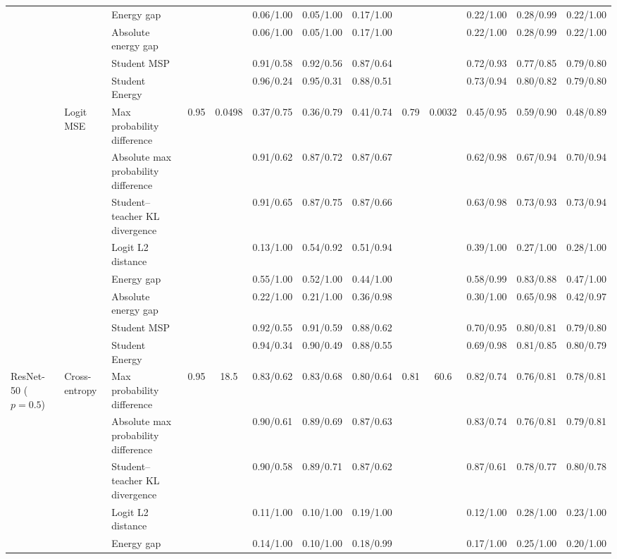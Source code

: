 \documentclass[border=2pt]{standalone}
\begin{document}
\begin{tabular}{lllcccccccccc}
 &  & Energy gap &  &  & 0.06/1.00 & 0.05/1.00 & 0.17/1.00 &  &  & 0.22/1.00 & 0.28/0.99 & 0.22/1.00 \\
 &  & Absolute energy gap &  &  & 0.06/1.00 & 0.05/1.00 & 0.17/1.00 &  &  & 0.22/1.00 & 0.28/0.99 & 0.22/1.00 \\
 &  & Student MSP &  &  & 0.91/0.58 & 0.92/0.56 & 0.87/0.64 &  &  & 0.72/0.93 & 0.77/0.85 & 0.79/0.80 \\
 &  & Student Energy &  &  & 0.96/0.24 & 0.95/0.31 & 0.88/0.51 &  &  & 0.73/0.94 & 0.80/0.82 & 0.79/0.80 \\
\addlinespace
 & Logit MSE & Max probability difference & 0.95 & 0.0498 & 0.37/0.75 & 0.36/0.79 & 0.41/0.74 & 0.79 & 0.0032 & 0.45/0.95 & 0.59/0.90 & 0.48/0.89 \\
 &  & Absolute max probability difference &  &  & 0.91/0.62 & 0.87/0.72 & 0.87/0.67 &  &  & 0.62/0.98 & 0.67/0.94 & 0.70/0.94 \\
 &  & Student--teacher KL divergence &  &  & 0.91/0.65 & 0.87/0.75 & 0.87/0.66 &  &  & 0.63/0.98 & 0.73/0.93 & 0.73/0.94 \\
 &  & Logit L2 distance &  &  & 0.13/1.00 & 0.54/0.92 & 0.51/0.94 &  &  & 0.39/1.00 & 0.27/1.00 & 0.28/1.00 \\
 &  & Energy gap &  &  & 0.55/1.00 & 0.52/1.00 & 0.44/1.00 &  &  & 0.58/0.99 & 0.83/0.88 & 0.47/1.00 \\
 &  & Absolute energy gap &  &  & 0.22/1.00 & 0.21/1.00 & 0.36/0.98 &  &  & 0.30/1.00 & 0.65/0.98 & 0.42/0.97 \\
 &  & Student MSP &  &  & 0.92/0.55 & 0.91/0.59 & 0.88/0.62 &  &  & 0.70/0.95 & 0.80/0.81 & 0.79/0.80 \\
 &  & Student Energy &  &  & 0.94/0.34 & 0.90/0.49 & 0.88/0.55 &  &  & 0.69/0.98 & 0.81/0.85 & 0.80/0.79 \\
\midrule
ResNet-50 ($p=0.5$) & Cross-entropy & Max probability difference & 0.95 & 18.5 & 0.83/0.62 & 0.83/0.68 & 0.80/0.64 & 0.81 & 60.6 & 0.82/0.74 & 0.76/0.81 & 0.78/0.81 \\
 &  & Absolute max probability difference &  &  & 0.90/0.61 & 0.89/0.69 & 0.87/0.63 &  &  & 0.83/0.74 & 0.76/0.81 & 0.79/0.81 \\
 &  & Student--teacher KL divergence &  &  & 0.90/0.58 & 0.89/0.71 & 0.87/0.62 &  &  & 0.87/0.61 & 0.78/0.77 & 0.80/0.78 \\
 &  & Logit L2 distance &  &  & 0.11/1.00 & 0.10/1.00 & 0.19/1.00 &  &  & 0.12/1.00 & 0.28/1.00 & 0.23/1.00 \\
 &  & Energy gap &  &  & 0.14/1.00 & 0.10/1.00 & 0.18/0.99 &  &  & 0.17/1.00 & 0.25/1.00 & 0.20/1.00 \\

\end{tabular}
\end{document}
